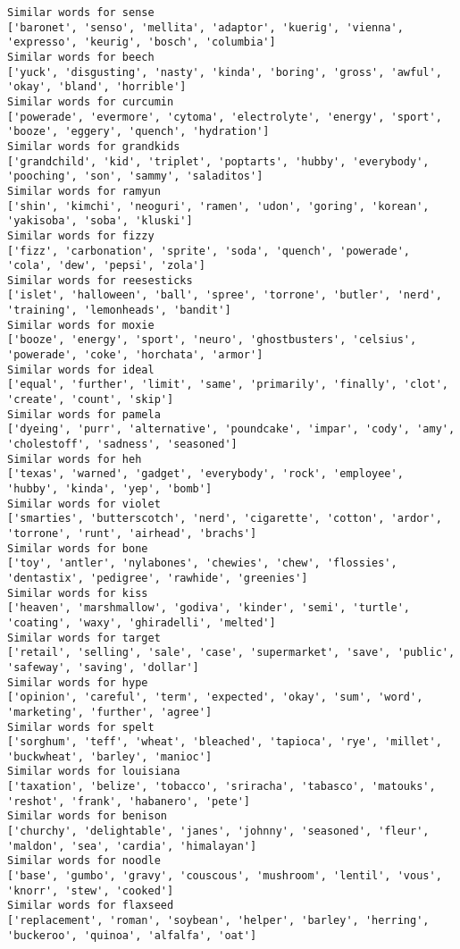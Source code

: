 \documentclass[11pt]{article}
\begin{document}
\begin{Verbatim}[commandchars=\\\{\}]
Similar words for sense
['baronet', 'senso', 'mellita', 'adaptor', 'kuerig', 'vienna', 'expresso', 'keurig', 'bosch', 'columbia']
Similar words for beech
['yuck', 'disgusting', 'nasty', 'kinda', 'boring', 'gross', 'awful', 'okay', 'bland', 'horrible']
Similar words for curcumin
['powerade', 'evermore', 'cytoma', 'electrolyte', 'energy', 'sport', 'booze', 'eggery', 'quench', 'hydration']
Similar words for grandkids
['grandchild', 'kid', 'triplet', 'poptarts', 'hubby', 'everybody', 'pooching', 'son', 'sammy', 'saladitos']
Similar words for ramyun
['shin', 'kimchi', 'neoguri', 'ramen', 'udon', 'goring', 'korean', 'yakisoba', 'soba', 'kluski']
Similar words for fizzy
['fizz', 'carbonation', 'sprite', 'soda', 'quench', 'powerade', 'cola', 'dew', 'pepsi', 'zola']
Similar words for reesesticks
['islet', 'halloween', 'ball', 'spree', 'torrone', 'butler', 'nerd', 'training', 'lemonheads', 'bandit']
Similar words for moxie
['booze', 'energy', 'sport', 'neuro', 'ghostbusters', 'celsius', 'powerade', 'coke', 'horchata', 'armor']
Similar words for ideal
['equal', 'further', 'limit', 'same', 'primarily', 'finally', 'clot', 'create', 'count', 'skip']
Similar words for pamela
['dyeing', 'purr', 'alternative', 'poundcake', 'impar', 'cody', 'amy', 'cholestoff', 'sadness', 'seasoned']
Similar words for heh
['texas', 'warned', 'gadget', 'everybody', 'rock', 'employee', 'hubby', 'kinda', 'yep', 'bomb']
Similar words for violet
['smarties', 'butterscotch', 'nerd', 'cigarette', 'cotton', 'ardor', 'torrone', 'runt', 'airhead', 'brachs']
Similar words for bone
['toy', 'antler', 'nylabones', 'chewies', 'chew', 'flossies', 'dentastix', 'pedigree', 'rawhide', 'greenies']
Similar words for kiss
['heaven', 'marshmallow', 'godiva', 'kinder', 'semi', 'turtle', 'coating', 'waxy', 'ghiradelli', 'melted']
Similar words for target
['retail', 'selling', 'sale', 'case', 'supermarket', 'save', 'public', 'safeway', 'saving', 'dollar']
Similar words for hype
['opinion', 'careful', 'term', 'expected', 'okay', 'sum', 'word', 'marketing', 'further', 'agree']
Similar words for spelt
['sorghum', 'teff', 'wheat', 'bleached', 'tapioca', 'rye', 'millet', 'buckwheat', 'barley', 'manioc']
Similar words for louisiana
['taxation', 'belize', 'tobacco', 'sriracha', 'tabasco', 'matouks', 'reshot', 'frank', 'habanero', 'pete']
Similar words for benison
['churchy', 'delightable', 'janes', 'johnny', 'seasoned', 'fleur', 'maldon', 'sea', 'cardia', 'himalayan']
Similar words for noodle
['base', 'gumbo', 'gravy', 'couscous', 'mushroom', 'lentil', 'vous', 'knorr', 'stew', 'cooked']
Similar words for flaxseed
['replacement', 'roman', 'soybean', 'helper', 'barley', 'herring', 'buckeroo', 'quinoa', 'alfalfa', 'oat']

\end{Verbatim}
\end{document}
